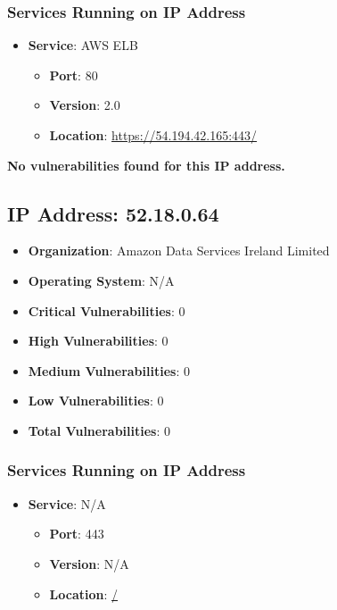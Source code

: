 \documentclass{article}
\begin{document}
\subsubsection*{Services Running on IP Address}

\begin{itemize}
    
        \item \textbf{Service}: AWS ELB
        \begin{itemize}
            \item \textbf{Port}: 80
            \item \textbf{Version}:  2.0 
            \item \textbf{Location}: \href{ https://54.194.42.165:443/ }{ https://54.194.42.165:443/ }
        \end{itemize}
    
\end{itemize}


\textbf{No vulnerabilities found for this IP address.}




\clearpage



\subsection*{IP Address: 52.18.0.64}

\begin{itemize}
    \item \textbf{Organization}: Amazon Data Services Ireland Limited
    \item \textbf{Operating System}:  N/A 
    \item \textbf{Critical Vulnerabilities}: 0
    \item \textbf{High Vulnerabilities}: 0
    \item \textbf{Medium Vulnerabilities}: 0
    \item \textbf{Low Vulnerabilities}: 0
    \item \textbf{Total Vulnerabilities}: 0
\end{itemize}

\subsubsection*{Services Running on IP Address}

\begin{itemize}
    
        \item \textbf{Service}: N/A
        \begin{itemize}
            \item \textbf{Port}: 443
            \item \textbf{Version}:  N/A 
            \item \textbf{Location}: \href{ / }{ / }
        \end{itemize}
    
\end{itemize}
\end{document}
